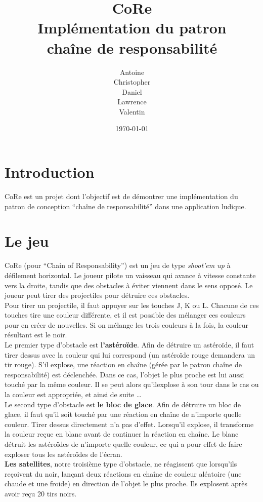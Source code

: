 \documentclass[11pt,a4paper,twoside,svgnames]{article}
\title{\color{Chocolate}\huge\bfseries CoRe\\Implémentation du patron\\chaîne de responsabilité}
\author{Antoine \bsc{Friant}\\
Christopher \bsc{Meier}\\
Daniel \bsc{Palumbo}\\
Lawrence \bsc{Stalder}\\
Valentin \bsc{Finini}}
\date{\today}
\begin{document}
\maketitle
\clearpage
\tableofcontents
\clearpage
\section{Introduction}
CoRe est un projet dont l'objectif est de démontrer une implémentation du patron de conception ``chaîne de responsabilité'' dans une application ludique.

\section{Le jeu}
CoRe (pour ``Chain of Responsability'') est un jeu de type \textit{shoot'em up} à défilement horizontal. Le joueur pilote un vaisseau qui avance à vitesse constante vers la droite, tandis que des obstacles à éviter viennent dans le sens opposé. Le joueur peut tirer des projectiles pour détruire ces obstacles.\\

Pour tirer un projectile, il faut appuyer sur les touches J, K ou L. Chacune de ces touches tire une couleur différente, et il est possible des mélanger ces couleurs pour en créer de nouvelles. Si on mélange les trois couleurs à la fois, la couleur résultant est le noir.\\

Le premier type d'obstacle est \textbf{l'astéroïde}. Afin de détruire un astéroïde, il faut tirer dessus avec la couleur qui lui correspond (un astéroïde rouge demandera un tir rouge). S'il explose, une réaction en chaîne (gérée par le patron chaîne de responsabilité) est déclenchée. Dans ce cas, l'objet le plus proche est lui aussi touché par la même couleur. Il se peut alors qu'ilexplose à son tour dans le cas ou la couleur est appropriée, et ainsi de suite \ldots\\

Le second type d'obstacle est \textbf{le bloc de glace}. Afin de détruire un bloc de glace, il faut qu'il soit touché par une réaction en chaîne de n'importe quelle couleur. Tirer dessus directement n'a pas d'effet. Lorsqu'il explose, il transforme la couleur reçue en blanc avant de continuer la réaction en chaîne. Le blanc détruit les astéroïdes de n'importe quelle couleur, ce qui a pour effet de faire exploser tous les astéroïdes de l'écran.\\

\textbf{Les satellites}, notre troisième type d'obstacle, ne réagissent que lorsqu'ils reçoivent du noir, lançant deux réactions en chaîne de couleur aléatoire (une chaude et une froide) en direction de l'objet le plus proche. Ils explosent après avoir reçu 20 tirs noirs.\\
\end{document}
